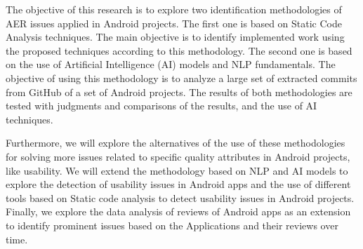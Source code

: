 The objective of this research is to explore two identification methodologies of AER issues applied in Android projects. The first one is based on Static Code Analysis techniques. The main objective is to identify implemented work using the proposed techniques according to this methodology. The second one is based on the use of Artificial Intelligence (AI) models and NLP fundamentals. The objective of using this methodology is to analyze a large set of extracted commits from GitHub of a set of Android projects. The results of both methodologies are tested with judgments and comparisons of the results, and the use of AI techniques.

Furthermore, we will explore the alternatives of the use of these methodologies for solving more issues related to specific quality attributes in Android projects, like usability. We will extend the methodology based on NLP and AI models to explore the detection of usability issues in Android apps and the use of different tools based on Static code analysis to detect usability issues in Android projects.  Finally, we explore the data analysis of reviews of Android apps as an extension to identify prominent issues based on the Applications and their reviews over time.

\endinput

